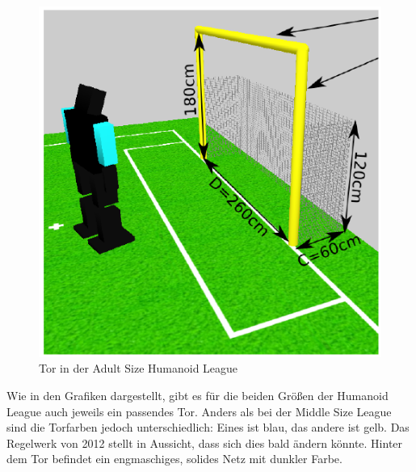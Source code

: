 \documentclass[a4paper,12pt]{article}
\begin{document}
\begin{figure}[H]
\includegraphics{humanoid-adultsize-goal.png}
\caption{Tor in der Adult Size Humanoid League}
\label{fig:goal-human-adult}
\end{figure}
Wie in den Grafiken dargestellt, gibt es für die beiden Größen der Humanoid League auch jeweils ein
passendes Tor. Anders als bei der Middle Size League sind die Torfarben jedoch unterschiedlich:
Eines ist blau, das andere ist gelb. Das Regelwerk von 2012 stellt in Aussicht, dass sich dies bald
ändern könnte. Hinter dem Tor befindet ein engmaschiges, solides Netz mit dunkler Farbe.
\end{document}
